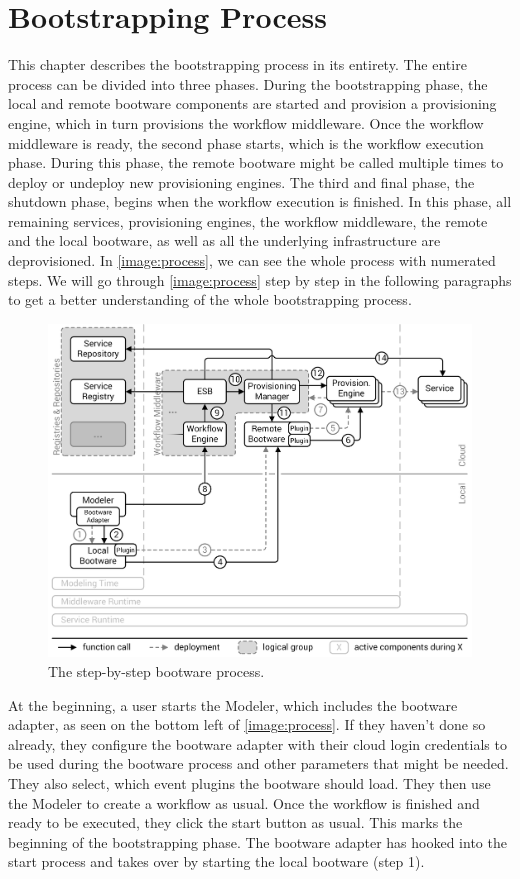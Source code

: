 \chapter{Bootstrapping Process}
\label{process}

This chapter describes the bootstrapping process in its entirety.
The entire process can be divided into three phases.
During the bootstrapping phase, the local and remote bootware components are started and provision a provisioning engine, which in turn provisions the workflow middleware.
Once the workflow middleware is ready, the second phase starts, which is the workflow execution phase.
During this phase, the remote bootware might be called multiple times to deploy or undeploy new provisioning engines.
The third and final phase, the shutdown phase, begins when the workflow execution is finished.
In this phase, all remaining services, provisioning engines, the workflow middleware, the remote and the local bootware, as well as all the underlying infrastructure are deprovisioned.
In \autoref{image:process}, we can see the whole process with numerated steps.
We will go through \autoref{image:process} step by step in the following paragraphs to get a better understanding of the whole bootstrapping process.

\begin{figure}[!htbp]
	\centering
	\includegraphics[resolution=600]{process/assets/process}
	\caption{The step-by-step bootware process.}
	\label{image:process}
\end{figure}

At the beginning, a user starts the Modeler, which includes the bootware adapter, as seen on the bottom left of \autoref{image:process}.
If they haven't done so already, they configure the bootware adapter with their cloud login credentials to be used during the bootware process and other parameters that might be needed. They also select, which event plugins the bootware should load.
They then use the Modeler to create a workflow as usual.
Once the workflow is finished and ready to be executed, they click the start button as usual.
This marks the beginning of the bootstrapping phase.
The bootware adapter has hooked into the start process and takes over by starting the local bootware (step 1).

